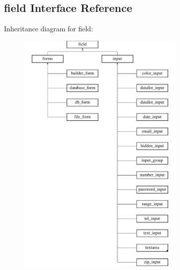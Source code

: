 \hypertarget{interfacefield}{\subsection{field Interface Reference}
\label{interfacefield}
}
Inheritance diagram for field\-:\begin{figure}[H]
\begin{center}
\leavevmode
\includegraphics[height=12.000000cm]{interfacefield}
\end{center}
\end{figure}

